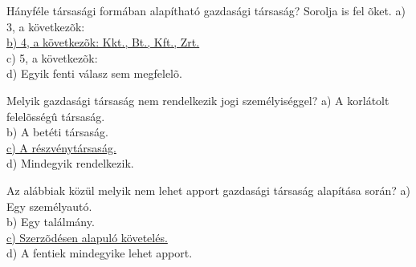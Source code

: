 \begin{frame}

\begin{tcolorbox}[title={67. Kérdés}]
Hányféle társasági formában alapítható gazdasági társaság? Sorolja is fel õket.
\tcblower
a) 3, a következõk:\\
\uline {b) 4, a következõk: Kkt., Bt., Kft., Zrt.}\\
c) 5, a következõk:\\
d) Egyik fenti válasz sem megfelelõ.
\end{tcolorbox}

\begin{tcolorbox}[title={68. Kérdés}]
Melyik gazdasági társaság nem rendelkezik jogi személyiséggel?
\tcblower
a) A korlátolt felelõsségû társaság.\\
b) A betéti társaság.\\
\uline {c) A részvénytársaság.}\\
d) Mindegyik rendelkezik.
\end{tcolorbox}

\begin{tcolorbox}[title={69. Kérdés}]
Az alábbiak közül melyik nem lehet apport gazdasági társaság alapítása során?
\tcblower
a) Egy személyautó.\\
b) Egy találmány.\\
\uline {c) Szerzõdésen alapuló követelés.}\\
d) A fentiek mindegyike lehet apport.
\end{tcolorbox}

\end{frame}


